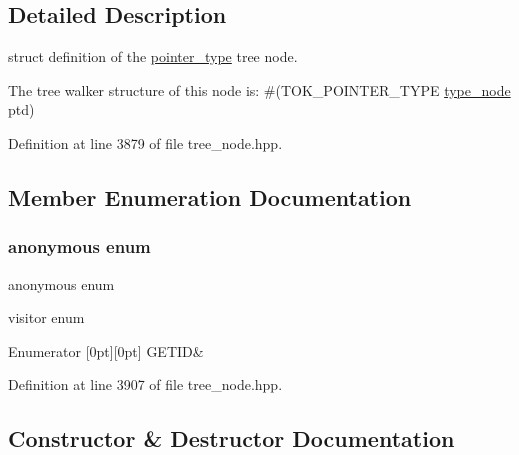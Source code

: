\subsection{Detailed Description}
struct definition of the \hyperlink{structpointer__type}{pointer\+\_\+type} tree node. 

The tree walker structure of this node is\+: \#(T\+O\+K\+\_\+\+P\+O\+I\+N\+T\+E\+R\+\_\+\+T\+Y\+PE \hyperlink{structtype__node}{type\+\_\+node} ptd) 

Definition at line 3879 of file tree\+\_\+node.\+hpp.



\subsection{Member Enumeration Documentation}
\mbox{\label{structpointer__type_a0c5f8c797ca1e9251bde1388c9282c6c}} 
\subsubsection{\texorpdfstring{anonymous enum}{anonymous enum}}
{\footnotesize\ttfamily anonymous enum}



visitor enum 

\begin{DoxyEnumFields}{Enumerator}
[0pt][0pt]{}\mbox{\label{structpointer__type_a0c5f8c797ca1e9251bde1388c9282c6cadea036a527e6586a9841c454a91907d1}} 
G\+E\+T\+ID&\\
\hline

\end{DoxyEnumFields}


Definition at line 3907 of file tree\+\_\+node.\+hpp.



\subsection{Constructor \& Destructor Documentation}
\mbox{\label{structpointer__type_a52e0ef3a51504f4faee3454bbdf41c89}} 
